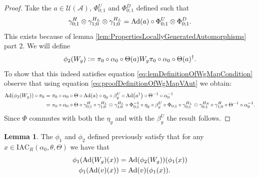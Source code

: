 \documentclass[12pt,a4paper,twoside]{article}
\newcommand{\IAC}{\textrm{IAC}}
\newcommand{\defeq}{\vcentcolon=}
\let\originalleft\left
\let\originalright\right
\renewcommand{\left}{\mathopen{}\mathclose\bgroup\originalleft}
\renewcommand{\right}{\aftergroup\egroup\originalright}
\newcommand{\UU}{\mathcal U}
\renewcommand{\AA}{\mathcal A}
\newcommand{\Ad}[1]{\textrm{Ad}\left(#1\right)}
\theoremstyle{definition}
\newtheorem{lemma}[theorem]{Lemma}
\numberwithin{equation}{section}
\begin{document}
\begin{proof}
	Take the $a\in\UU(\AA)$, $\Phi^U_{0;1}$ and $\Phi^D_{0;1}$ defined such that
	\begin{equation}\label{eq:proofDefinitionOfWgMapVAut}
		\gamma^H_{0;1}\otimes\gamma^{H_L}_{1;0}\otimes\gamma^{H_L}_{1;0}=\Ad{a}\circ\Phi^U_{0;1}\otimes\Phi^D_{0;1}.
	\end{equation}
	This exists because of lemma \ref{lem:PropertiesLocallyGeneratedAutomorphisms} part 2. We will define
	\begin{equation}
		\phi_2(W_g)\defeq \pi_0\circ\alpha_0\circ\Theta(a)W_g\pi_0\circ\alpha_0\circ\Theta(a)^\dagger.
	\end{equation}
	To show that this indeed satisfies equation \eqref{eq:lemDefinitionOfWgMapCondition} observe that using equation \eqref{eq:proofDefinitionOfWgMapVAut} we obtain:
	\begin{align}
		\Ad{\phi_2(W_g)}\circ\pi_0&=\pi_0\circ \alpha_0\circ\Theta\circ\Ad{a}\circ\eta_g\circ\beta_g^U\circ\Ad{a^{\dagger}}\circ\Theta^{-1}\circ\alpha_0^{-1}\\
		&=\pi_0\circ \alpha_0\circ\Theta\circ\gamma^H_{0;1}\circ\gamma^{H_L}_{1;0}\otimes\gamma^{H_L}_{1;0}\circ\Phi_{0;1}^{-1}\circ\eta_g\circ\beta_g^U\circ\Phi_{0;1}\circ\gamma^{H_L}_{0;1}\otimes\gamma^{H_R}_{0;1}\circ\gamma^H_{1;0}\circ\Theta^{-1}\circ\alpha_0^{-1}.
	\end{align}
	Since $\Phi$ commutes with both the $\eta_g$ and with the $\beta_g^U$ the result follows.
\end{proof}
\begin{lemma}\label{lem:phi1phi2matchingCondition}
	The $\phi_1$ and $\phi_2$ defined previously satisfy that for any $x\in\IAC_R(\alpha_0,\theta,\Theta)$ we have that
	\begin{align}
		\phi_1(\Ad{W_g}(x))&=\Ad{\phi_2(W_g)}(\phi_1(x))\\
		\phi_1(\Ad{v}(x))&=\Ad{v}(\phi_1(x)).
	\end{align}
\end{lemma}
\end{document}
